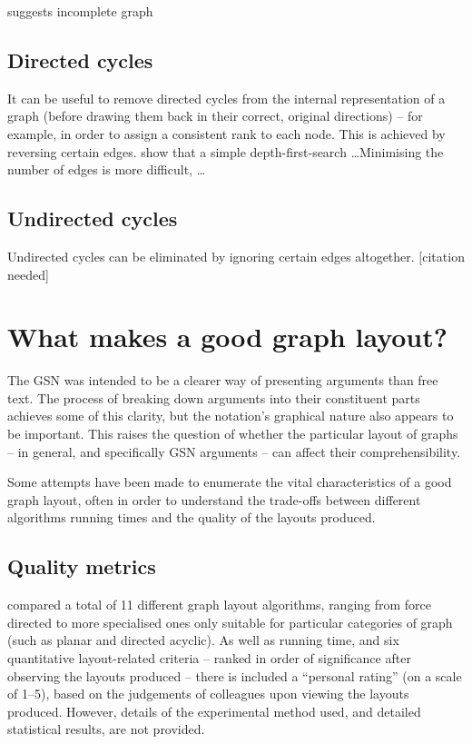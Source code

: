 suggests incomplete graph



\subsection{Directed cycles}

It can be useful to remove directed cycles from the internal representation of a graph
(before drawing them back in their correct, original directions)
-- for example, in order to assign a consistent rank to each node.
This is achieved by reversing certain edges.
\citet{gansner1993} show that a simple depth-first-search \ldots  Minimising the number of edges is more difficult, \citeauthor{gansner1993} \ldots



\subsection{Undirected cycles}

Undirected cycles can be eliminated by ignoring certain edges altogether.  [citation needed]



\section{What makes a good graph layout?}

The GSN was intended to be a clearer way of presenting arguments than free text.
The process of breaking down arguments into their constituent parts achieves some of this clarity,
but the notation's graphical nature also appears to be important.
This raises the question of whether the particular layout of graphs -- in general, and specifically GSN arguments -- can affect their comprehensibility.

Some attempts have been made to enumerate the vital characteristics of a good graph layout, often in order to understand the trade-offs between different algorithms running times and the quality of the layouts produced.


\subsection{Quality metrics}

\citet{Himsolt95comparingand} compared a total of 11 different graph layout algorithms, ranging from force directed to more specialised ones only suitable for particular categories of graph (such as planar and directed acyclic).
As well as running time, and six quantitative layout-related criteria -- ranked in order of significance after observing the layouts produced -- there is included a ``personal rating'' (on a scale of 1--5), based on the judgements of colleagues upon viewing the layouts produced.
However, details of the experimental method used, and detailed statistical results, are not provided.

